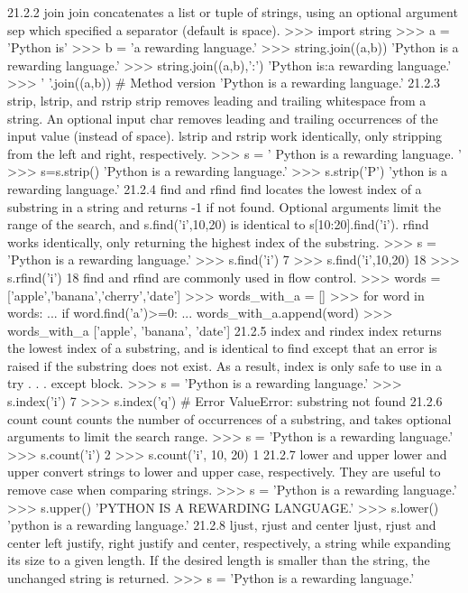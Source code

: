 21.2.2 join
join concatenates a list or tuple of strings, using an optional argument sep which specified a separator
(default is space).
>>> import string
>>> a = ’Python is’
>>> b = ’a rewarding language.’
>>> string.join((a,b))
’Python is a rewarding language.’
>>> string.join((a,b),’:’)
’Python is:a rewarding language.’
>>> ’ ’.join((a,b)) # Method version
’Python is a rewarding language.’
21.2.3 strip, lstrip, and rstrip
strip removes leading and trailing whitespace from a string. An optional input char removes leading
and trailing occurrences of the input value (instead of space). lstrip and rstrip work identically, only
stripping from the left and right, respectively.
>>> s = ’ Python is a rewarding language. ’
>>> s=s.strip()
’Python is a rewarding language.’
>>> s.strip(’P’)
’ython is a rewarding language.’
21.2.4 find and rfind
find locates the lowest index of a substring in a string and returns -1 if not found. Optional arguments
limit the range of the search, and s.find(’i’,10,20) is identical to s[10:20].find(’i’). rfind works
identically, only returning the highest index of the substring.
>>> s = ’Python is a rewarding language.’
>>> s.find(’i’)
7
>>> s.find(’i’,10,20)
18
>>> s.rfind(’i’)
18
find and rfind are commonly used in flow control.
>>> words = [’apple’,’banana’,’cherry’,’date’]
>>> words_with_a = []
>>> for word in words:
... if word.find(’a’)>=0:
... words_with_a.append(word)
>>> words_with_a
[’apple’, ’banana’, ’date’]
21.2.5 index and rindex
index returns the lowest index of a substring, and is identical to find except that an error is raised if the
substring does not exist. As a result, index is only safe to use in a try . . . except block.
>>> s = ’Python is a rewarding language.’
>>> s.index(’i’)
7
>>> s.index(’q’) # Error
ValueError: substring not found
21.2.6 count
count counts the number of occurrences of a substring, and takes optional arguments to limit the search
range.
>>> s = ’Python is a rewarding language.’
>>> s.count(’i’)
2
>>> s.count(’i’, 10, 20)
1
21.2.7 lower and upper
lower and upper convert strings to lower and upper case, respectively. They are useful to remove case
when comparing strings.
>>> s = ’Python is a rewarding language.’
>>> s.upper()
’PYTHON IS A REWARDING LANGUAGE.’
>>> s.lower()
’python is a rewarding language.’
21.2.8 ljust, rjust and center
ljust, rjust and center left justify, right justify and center, respectively, a string while expanding its size
to a given length. If the desired length is smaller than the string, the unchanged string is returned.
>>> s = ’Python is a rewarding language.’
